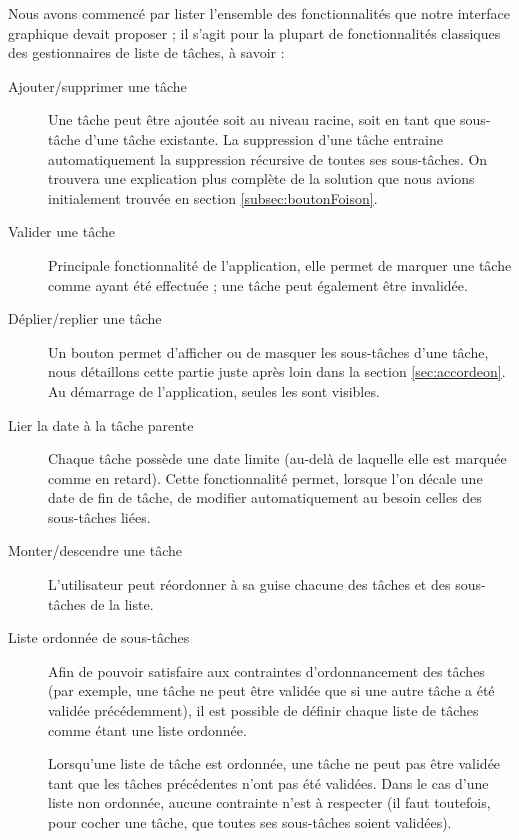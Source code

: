 \documentclass[11pt]{article}
\begin{document}
Nous avons commencé par lister l'ensemble des fonctionnalités que
notre interface graphique devait proposer ; il s'agit pour la plupart
de fonctionnalités classiques des gestionnaires de liste de tâches, à
savoir :
\begin{description}
\item[Ajouter/supprimer une tâche] Une tâche peut être ajoutée soit au
  niveau racine, soit en tant que sous-tâche d'une tâche existante. La
  suppression d'une tâche entraine automatiquement la suppression
  récursive de toutes ses sous-tâches. On trouvera une explication
  plus complète de la solution que nous avions initialement trouvée en
  section \ref{subsec:boutonFoison}.
\item[Valider une tâche] Principale fonctionnalité de l'application,
  elle permet de marquer une tâche comme ayant été effectuée ; une
  tâche peut également être invalidée.
\item[Déplier/replier une tâche] Un bouton permet d'afficher ou de
  masquer les sous-tâches d'une tâche, nous détaillons cette partie
  juste après loin dans la section \ref{sec:accordeon}. Au démarrage
  de l'application, seules les  sont
  visibles.
\item[Lier la date à la tâche parente] Chaque tâche possède une date
  limite (au-delà de laquelle elle est marquée comme en retard). Cette
  fonctionnalité permet, lorsque l'on décale une date de fin de tâche,
  de modifier automatiquement au besoin celles des sous-tâches liées.
\item[Monter/descendre une tâche] L'utilisateur peut réordonner à sa
  guise chacune des tâches et des sous-tâches de la liste.
\item[Liste ordonnée de sous-tâches] Afin de pouvoir satisfaire aux
  contraintes d'ordonnancement des tâches (par exemple, une tâche ne
  peut être validée que si une autre tâche a été validée
  précédemment), il est possible de définir chaque liste de tâches
  comme étant une liste ordonnée.

  Lorsqu'une liste de tâche est ordonnée, une tâche ne peut pas être
  validée tant que les tâches précédentes n'ont pas été validées. Dans
  le cas d'une liste non ordonnée, aucune contrainte n'est à respecter
  (il faut toutefois, pour cocher une tâche, que toutes ses
  sous-tâches soient validées).
\end{description}


\end{document}
